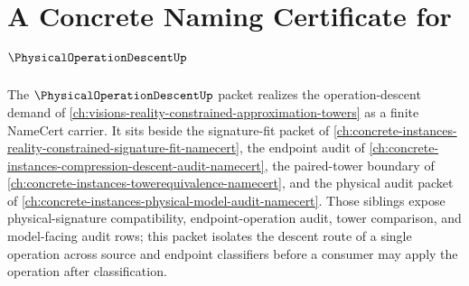 \chapter{A Concrete Naming Certificate for $\PhysicalOperationDescentUp$}
\label{ch:concrete-instances-physical-operation-descent-namecert}

The $\PhysicalOperationDescentUp$ packet realizes the operation-descent demand of \autoref{ch:visions-reality-constrained-approximation-towers} as a finite NameCert carrier. It sits beside the signature-fit packet of \autoref{ch:concrete-instances-reality-constrained-signature-fit-namecert}, the endpoint audit of \autoref{ch:concrete-instances-compression-descent-audit-namecert}, the paired-tower boundary of \autoref{ch:concrete-instances-towerequivalence-namecert}, and the physical audit packet of \autoref{ch:concrete-instances-physical-model-audit-namecert}. Those siblings expose physical-signature compatibility, endpoint-operation audit, tower comparison, and model-facing audit rows; this packet isolates the descent route of a single operation across source and endpoint classifiers before a consumer may apply the operation after classification.

